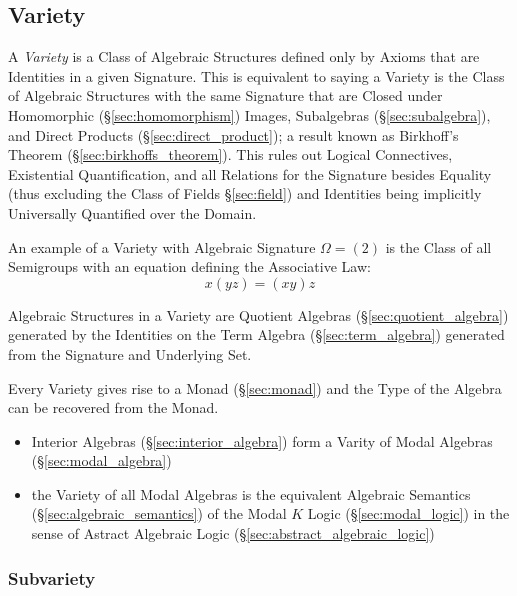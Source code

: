\subsection{Variety}\label{sec:variety}

A \emph{Variety} is a Class of Algebraic Structures defined only by
Axioms that are Identities in a given Signature. This is equivalent to
saying a Variety is the Class of Algebraic Structures with the same
Signature that are Closed under Homomorphic (\S\ref{sec:homomorphism})
Images, Subalgebras (\S\ref{sec:subalgebra}), and Direct Products
(\S\ref{sec:direct_product}); a result known as Birkhoff's Theorem
(\S\ref{sec:birkhoffs_theorem}). This rules out Logical Connectives,
Existential Quantification, and all Relations for the Signature
besides Equality (thus excluding the Class of Fields
\S\ref{sec:field}) and Identities being implicitly Universally
Quantified over the Domain.

An example of a Variety with Algebraic Signature $\Omega = (2)$ is the
Class of all Semigroups with an equation defining the Associative Law:
\[
    x(yz) = (xy)z
\]

Algebraic Structures in a Variety are Quotient Algebras
(\S\ref{sec:quotient_algebra}) generated by the Identities on the Term
Algebra (\S\ref{sec:term_algebra}) generated from the Signature and
Underlying Set.

Every Variety gives rise to a Monad (\S\ref{sec:monad}) and the Type
of the Algebra can be recovered from the Monad.

\begin{itemize}
  \item Interior Algebras (\S\ref{sec:interior_algebra}) form a Varity of Modal
    Algebras (\S\ref{sec:modal_algebra})
  \item the Variety of all Modal Algebras is the equivalent Algebraic Semantics
    (\S\ref{sec:algebraic_semantics}) of the Modal $K$ Logic
    (\S\ref{sec:modal_logic}) in the sense of Astract Algebraic Logic
    (\S\ref{sec:abstract_algebraic_logic})
\end{itemize}



\subsubsection{Subvariety}\label{sec:subvariety_theorem}


